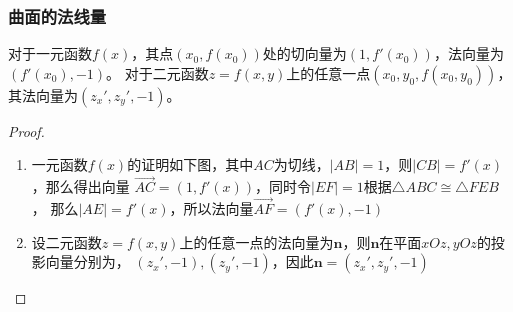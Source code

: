 \subsubsection{曲面的法线量}
对于一元函数$f(x)$，其点$(x_0,f(x_0))$处的切向量为$(1,f'(x_0))$，法向量为$(f'(x_0),-1)$。
对于二元函数$z=f(x,y)$上的任意一点$(x_0,y_0,f(x_0,y_0))$，其法向量为$(z_x',z_y',-1)$。
\begin{marginfigure}
    \centering
\end{marginfigure}

\begin{proof}
    \begin{enumerate}[(1)]
        \item 一元函数$f(x)$的证明如下图，其中$AC$为切线，$|AB|=1$，则$|CB|=f'(x)$，那么得出向量
              $\overrightarrow{AC}=(1,f'(x))$，同时令$|EF|=1$根据$\triangle ABC \cong\triangle FEB$，
              那么$|AE|=f'(x)$，所以法向量$\overrightarrow{AF}=(f'(x),-1)$

        \item 设二元函数$z=f(x,y)$上的任意一点的法向量为$\bm{n}$，则$\bm{n}$在平面$xOz, yOz$的投影向量分别为，
              $(z_x',-1),(z_y',-1)$，因此$\bm{n} = (z_x',z_y',-1)$
    \end{enumerate}
\end{proof}
